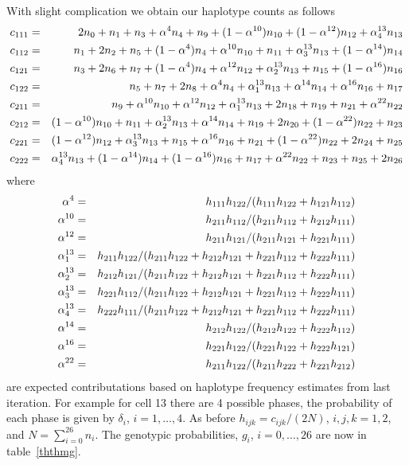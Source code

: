 With slight complication we obtain our haplotype counts as follows
\begin{eqnarray*}
c_{111}&=&2 n_{0}+n_{1}+n_{3}+\alpha^4 n_{4}+n_{9}+(1-\alpha^{10}) n_{10}+(1-\alpha^{12}) n_{12}+\alpha^{13}_4 n_{13}\cr
c_{112}&=&n_{1}+2 n_{2}+n_{5}+(1-\alpha^4) n_{4}+\alpha^{10} n_{10}+n_{11}+\alpha^{13}_3 n_{13}+(1-\alpha^{14}) n_{14}\cr
c_{121}&=&n_{3}+2 n_{6}+n_{7}+(1-\alpha^4) n_{4}+\alpha^{12} n_{12}+\alpha^{13}_2 n_{13}+n_{15}+(1-\alpha^{16}) n_{16}\cr
c_{122}&=&n_{5}+n_{7}+2 n_{8}+\alpha^4 n_{4}+\alpha^{13}_1 n_{13}+\alpha^{14} n_{14}+\alpha^{16} n_{16}+n_{17}\cr
c_{211}&=&n_{9}+\alpha^{10} n_{10}+\alpha^{12} n_{12}+\alpha^{13}_1 n_{13}+2 n_{18}+n_{19}+n_{21}+\alpha^{22} n_{22}\cr
c_{212}&=&(1-\alpha^{10}) n_{10}+n_{11}+\alpha^{13}_2 n_{13}+\alpha^{14} n_{14}+n_{19}+2 n_{20}+(1-\alpha^{22}) n_{22}+n_{23}\cr
c_{221}&=&(1-\alpha^{12}) n_{12}+\alpha^{13}_3 n_{13}+n_{15}+\alpha^{16} n_{16}+n_{21}+(1-\alpha^{22}) n_{22}+2 n_{24}+n_{25}\cr
c_{222}&=&\alpha^{13}_4 n_{13}+(1-\alpha^{14}) n_{14}+(1-\alpha^{16}) n_{16}+n_{17}+\alpha^{22} n_{22}+n_{23}+n_{25}+2 n_{26}
\end{eqnarray*}
where
\begin{eqnarray*}
   \alpha^4&=&h_{111}h_{122}/(h_{111}h_{122}+h_{121}h_{112})\cr
    \alpha^{10}&=&h_{211}h_{112}/(h_{211}h_{112}+h_{212}h_{111})\cr
   \alpha^{12}&=&h_{211}h_{121}/(h_{211}h_{121}+h_{221}h_{111})\cr
 \alpha^{13}_1&=&h_{211}h_{122}/(h_{211}h_{122}+h_{212}h_{121}+h_{221}h_{112}+h_{222}h_{111})\cr
 \alpha^{13}_2&=&h_{212}h_{121}/(h_{211}h_{122}+h_{212}h_{121}+h_{221}h_{112}+h_{222}h_{111})\cr
 \alpha^{13}_3&=&h_{221}h_{112}/(h_{211}h_{122}+h_{212}h_{121}+h_{221}h_{112}+h_{222}h_{111})\cr
 \alpha^{13}_4&=&h_{222}h_{111}/(h_{211}h_{122}+h_{212}h_{121}+h_{221}h_{112}+h_{222}h_{111})\cr
      \alpha^{14}&=&h_{212}h_{122}/(h_{212}h_{122}+h_{222}h_{112})\cr
     \alpha^{16}&=&h_{221}h_{122}/(h_{221}h_{122}+h_{222}h_{121})\cr
   \alpha^{22}&=&h_{211}h_{122}/(h_{211}h_{222}+h_{221}h_{212})
\end{eqnarray*}
are expected contributations based on haplotype frequency estimates from last
iteration.  For example for cell 13 there are 4 possible phases, the
probability of each phase is given by $\delta_i$, $i=1,\ldots, 4$.  As before
$h_{ijk}=c_{ijk}/(2N)$, $i,j,k=1,2$, and $N=\sum_{i=0}^{26}n_i$.  The
genotypic probabilities, $g_i$, $i=0,\ldots,26$ are now in table~\ref{ththmg}.


